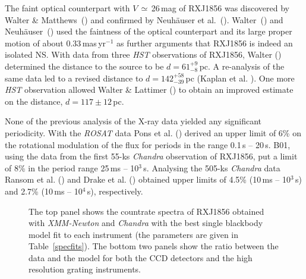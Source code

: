 \documentclass[twocolumn]{aa}
\newcommand{\modi}[1]{{#1}}
\begin{document}
The faint optical counterpart with $V$\,$\simeq$\,26\,mag of RXJ1856
was discovered by Walter \& Matthews~(\cite{WalMat97}) and
confirmed by Neuh\"auser et al.~(\cite{Neuetal98}).
Walter~(\cite{Wal01}) and Neuh\"auser~(\cite{Neu01}) used
the faintness of the optical counterpart and its large proper motion
of about $0.33$\,mas\,yr$^{-1}$ as further arguments
that RXJ1856 is indeed an isolated NS.
With data from three {\em HST} observations of RXJ1856,
Walter (\cite{Wal01})
determined the distance to the source
to be $d=61^{+9}_{-8}$\,pc.
A re-analysis of the same data led to a revised distance to 
$d=142^{+58}_{-39}$\,pc (Kaplan et al. \cite{KapKerAnd02}).
One more {\em HST} observation allowed Walter \& Lattimer 
(\cite{WalLat02}) to obtain an improved estimate on the 
distance, $d=117\pm 12$\,pc.

None of the previous analysis of the X-ray data yielded any 
significant periodicity. 
With the {\sl ROSAT} data Pons et al. (\cite{Ponetal02}) derived
an upper limit of 6\% on the rotational modulation of the flux
for periods in the range 0.1\,s -- 20\,s.
B01, using the data from the first 55-ks {\em Chandra} observation of RXJ1856,
put a limit of 8\% in the period
range 25\,ms -- 10$^3$\,s. 
Analysing the 505-ks {\em Chandra} data Ransom et
al. (\cite{RanGaeSla02}) and Drake et al. (\cite{Draetal02}) 
obtained 
upper limits of 4.5\% (10\,ms -- 10$^3$\,s) and  2.7\% (10\,ms -- 10$^4$\,s),
respectively.  
%
%
\begin{figure}
   \centerline{ }
   \caption{\modi{The top panel shows the countrate spectra of RXJ1856
   obtained with {\sl XMM-Newton} and {\sl Chandra} with the best 
   single blackbody model fit to each instrument (the parameters 
   are given in Table~\ref{specfits}). 
   The bottom two panels show the ratio between the data and the model  
   for both the CCD detectors and the high resolution grating 
   instruments.}
\label{xmmbb} }	      
\end{figure}
\end{document}
